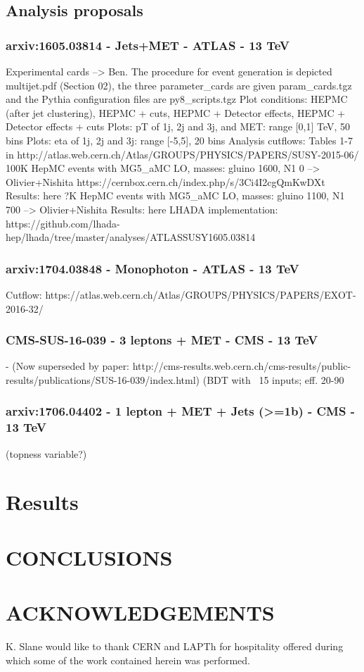 \documentclass[11pt]{cernrep}
\begin{document}
\subsection{Analysis proposals}

\subsubsection{arxiv:1605.03814 - Jets+MET - ATLAS - 13 TeV}

Experimental cards –> Ben. The procedure for event generation is depicted multijet.pdf (Section 02), the three parameter_cards are given param_cards.tgz and the Pythia configuration files are py8_scripts.tgz
Plot conditions: HEPMC (after jet clustering), HEPMC + cuts, HEPMC + Detector effects, HEPMC + Detector effects + cuts
Plots: pT of 1j, 2j and 3j, and MET: range [0,1] TeV, 50 bins
Plots: eta of 1j, 2j and 3j: range [-5,5], 20 bins
Analysis cutflows: Tables 1-7 in http://atlas.web.cern.ch/Atlas/GROUPS/PHYSICS/PAPERS/SUSY-2015-06/
100K HepMC events with MG5_aMC LO, masses: gluino 1600, N1 0 –> Olivier+Nishita https://cernbox.cern.ch/index.php/s/3Ci4I2cgQmKwDXt
Results: here
?K HepMC events with MG5_aMC LO, masses: gluino 1100, N1 700 –> Olivier+Nishita
Results: here
LHADA implementation: https://github.com/lhada-hep/lhada/tree/master/analyses/ATLASSUSY1605.03814

\subsubsection{arxiv:1704.03848 - Monophoton - ATLAS - 13 TeV}
Cutflow: https://atlas.web.cern.ch/Atlas/GROUPS/PHYSICS/PAPERS/EXOT-2016-32/

\subsubsection{CMS-SUS-16-039 - 3 leptons + MET - CMS - 13 TeV} - (Now superseded by paper: http://cms-results.web.cern.ch/cms-results/public-results/publications/SUS-16-039/index.html)  (BDT with ~15 inputs; eff. 20-90%

\subsubsection{arxiv:1706.04402 - 1 lepton + MET + Jets (>=1b) - CMS - 13 TeV} (topness variable?)

\section{Results}

\section*{CONCLUSIONS}


\section*{ACKNOWLEDGEMENTS}
K. Slane would like to thank CERN and LAPTh for hospitality offered
during which some of the work contained herein was performed.


\end{document}
